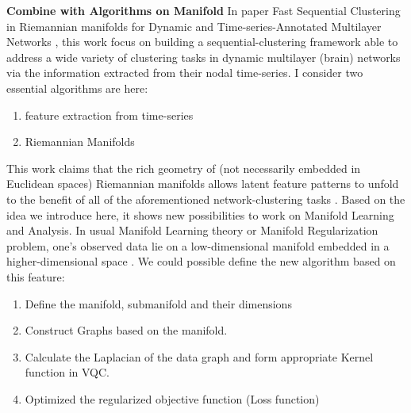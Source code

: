 \documentclass{article}
\begin{document}
\textbf{Combine with Algorithms on Manifold}
In paper Fast Sequential Clustering in Riemannian
manifolds for Dynamic and Time-series-Annotated Multilayer Networks \cite{manifold1}, this
work focus on building a sequential-clustering framework able to address
a wide variety of clustering tasks in dynamic multilayer (brain) networks
via the information extracted from their nodal time-series.
I consider two essential algorithms are here:
\begin{enumerate}
  \item feature extraction from time-series
  \item Riemannian Manifolds
\end{enumerate}
This work claims that the rich geometry of 
(not necessarily embedded in Euclidean spaces) Riemannian manifolds 
allows latent feature patterns to unfold to the benefit of all of 
the aforementioned network-clustering tasks \cite{manifold1}.
Based on the idea we introduce here, it shows new possibilities to 
work on Manifold Learning and Analysis. In usual Manifold Learning 
theory or Manifold Regularization problem, one's observed data lie on a 
low-dimensional manifold embedded in a higher-dimensional space \cite{manifold2}. 
We could possible define the new algorithm based on this feature: 
\begin{enumerate}
  \item Define the manifold, submanifold and their dimensions
  \item Construct Graphs based on the manifold. 
  \item Calculate the Laplacian of the data graph and form 
        appropriate Kernel function in VQC. 
  \item Optimized the regularized objective function (Loss function)
\end{enumerate} 

% 
\end{document}
